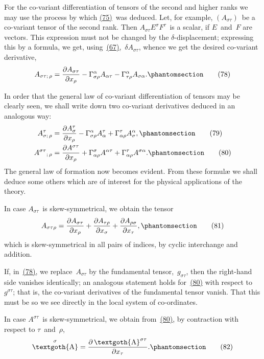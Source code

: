 \documentclass[12pt]{book}[2005/09/16]
\newcommand{\Change}[2]{#2}
\newcommand{\Add}[1]{\Change{}{#1}}
\newcommand{\PageSep}[1]{\ignorespaces}
\newcommand{\Tag}[1]{%
  \phantomsection
  \label{eqn:#1}
  \tag*{#1}
}
\newcommand{\Eqref}[1]{\hyperref[eqn:#1]{#1}}
\newcommand{\dd}{\partial}
\newcommand{\Tensor}[1]{\textgoth{#1}}
\DeclareMathOperator{\tA}{\Tensor{A}}
\begin{document}
For the co-variant differentiation of tensors of the
second and higher ranks we may use the process by
which \Eqref{(75)}~was deduced. Let, for example, $(A_{\sigma\tau})$~be a
co-variant tensor of the second rank. Then $A_{\sigma\tau} E^{\sigma} F^{\tau}$~is
a scalar, if $E$~and~$F$ are vectors. This expression must
not be changed by the $\delta$-displacement; expressing this
by a formula, we get, using~\Eqref{(67)},~$\delta A_{\sigma\tau}$, whence we get the
desired co-variant derivative,
\[
A_{\sigma\tau;\, \rho}
  = \frac{\dd A_{\sigma\tau}}{\dd x_{\rho}}
  - \Gamma_{\sigma\rho}^{\alpha} A_{\alpha\tau}
  - \Gamma_{\tau\rho}^{\alpha} A_{\sigma\alpha}\Add{.}
\Tag{(78)}
\]

In order that the general law of co-variant differentiation
of tensors may be clearly seen, we shall write
down two co-variant derivatives deduced in an analogous
way:
\begin{align*}
A_{\sigma;\, \rho}^{\tau}
  &= \frac{\dd A_{\sigma}^{\tau}}{\dd x_{\rho}}
  - \Gamma_{\sigma\rho}^{\alpha} A_{\alpha}^{\tau}
  + \Gamma_{\alpha\rho}^{\tau} A_{\sigma}^{\alpha}\Add{,}
\Tag{(79)} \\
%
{A^{\sigma\tau}}_{;\, \rho}
  &= \frac{\dd A^{\sigma\tau}}{\dd x_{\rho}}
  + \Gamma_{\alpha\rho}^{\sigma} A^{\alpha\tau}
  + \Gamma_{\alpha\rho}^{\tau} A^{\sigma\alpha}\Add{.}
\Tag{(80)}
\end{align*}
\PageSep{82}
The general law of formation now becomes evident.
From these formulæ we shall deduce some others which
are of interest for the physical applications of the theory.

In case $A_{\sigma\tau}$~is skew-symmetrical, we obtain the tensor
\[
A_{\sigma\tau\rho}
  = \frac{\dd A_{\sigma\tau}}{\dd x_{\rho}}
  + \frac{\dd A_{\tau\rho}}{\dd x_{\sigma}}
  + \frac{\dd A_{\rho\sigma}}{\dd x_{\tau}}\Add{,}
\Tag{(81)}
\]
which is skew-symmetrical in all pairs of indices, by cyclic
interchange and addition.

If, in~\Eqref{(78)}, we replace~$A_{\sigma\tau}$ by the fundamental tensor,~$g_{\sigma\tau}$,
then the right-hand side vanishes identically; an
analogous statement holds for~\Eqref{(80)} with respect to~$g^{\sigma\tau}$;
that is, the co-variant derivatives of the fundamental
tensor vanish. That this must be so we see directly in
the local system of co-ordinates.

In case $A^{\sigma\tau}$~is skew-symmetrical, we obtain from~\Eqref{(80)},
by contraction with respect to $\tau$~and~$\rho$,
\[
\tA^{\sigma} = \frac{\dd \tA^{\sigma\tau}}{\dd x_{\tau}}\Add{.}
\Tag{(82)}
\]
\end{document}
